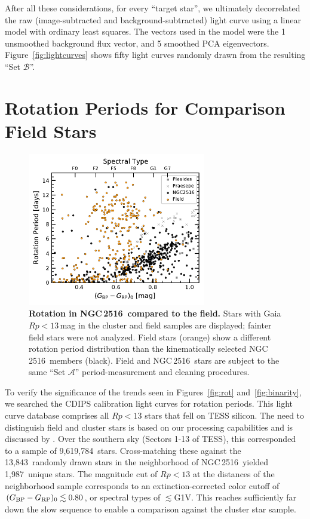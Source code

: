 \documentclass[12pt,twocolumn,tighten]{aastex63}
\newcommand{\cn}{NGC\,2516} %
\newcommand{\nnbhd}{13{,}843} %
\newcommand{\ncalibration}{9{,}619{,}784} %
\newcommand{\nnbhdcalibstar}{1{,}987} %
\newcommand{\bpmrpo}{(G_{\rm BP}-G_{\rm RP})_0}
\begin{document}
After all these considerations, for every ``target star'', we
ultimately decorrelated the raw (image-subtracted and
background-subtracted) light curve using a linear model with ordinary
least squares.  The vectors used in the model were the 1
unsmoothed background flux vector, and 5 smoothed PCA eigenvectors.
Figure~\ref{fig:lightcurves} shows fifty light curves
randomly drawn from the resulting ``Set $\mathcal{B}$''.




\section{Rotation Periods for Comparison Field Stars}
\label{app:compstar}

\begin{figure}[t]
	\begin{center}
		\leavevmode
    \includegraphics[width=0.69\textwidth]{f9.pdf}
	\end{center}
	\vspace{-0.7cm}
	\caption{ {\bf Rotation in \cn\ compared to the field.}
  Stars with Gaia $Rp<13$\,mag in the cluster and field samples are
  displayed; fainter field stars were not analyzed.  Field
  stars (orange) show a different rotation period distribution than
  the kinematically selected \cn\ members (black).  Field and \cn\
  stars are subject to the same ``Set $\mathcal{A}$''
  period-measurement and cleaning procedures.
  \label{fig:compstar}
	}
\end{figure}

To verify the significance of the trends seen in Figures~\ref{fig:rot}
and~\ref{fig:binarity}, we searched the CDIPS calibration light curves
for rotation periods.  This light curve database comprises all $Rp<13$
stars that fell on TESS silicon. The need to distinguish field and
cluster stars is based on our processing capabilities and is discussed
by \citet{bouma_cdipsI_2019}.  Over the southern sky (Sectors 1-13 of
TESS), this corresponded to a sample of \ncalibration\ stars.
Cross-matching these against the \nnbhd\ randomly drawn stars in the
neighborhood of \cn\ yielded \nnbhdcalibstar\ unique stars.  The
magnitude cut of $Rp<13$ at the distances of the neighborhood sample
corresponds to an extinction-corrected color cutoff of $\bpmrpo
\lesssim 0.80$, or spectral types of $\lesssim$G1V.  This reaches
sufficiently far down the slow sequence to enable a comparison against
the cluster star sample.
\end{document}
